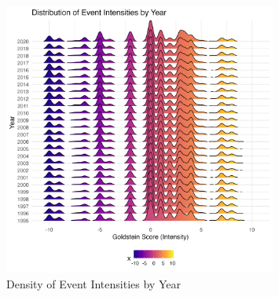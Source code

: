 \documentclass[12pt]{article}
\begin{document}
\begin{figure}[H]
\centering
\includegraphics[width=0.8\textwidth]{figures/icews_ridge_intensity_by_year.png}
\caption{Density of Event Intensities by Year}
\end{figure}
\end{document}
